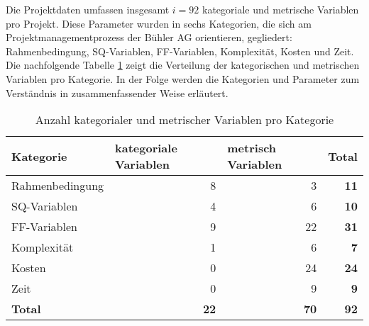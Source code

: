 \newline\newline
Die Projektdaten umfassen insgesamt $i = 92$ kategoriale und metrische Variablen pro Projekt. Diese Parameter wurden in sechs Kategorien, die sich am Projektmanagementprozess der Bühler AG orientieren, gegliedert: Rahmenbedingung, SQ-Variablen, FF-Variablen, Komplexität, Kosten und Zeit. Die nachfolgende Tabelle \ref{tab:katmet} zeigt die Verteilung der kategorischen und metrischen Variablen pro Kategorie. In der Folge werden die Kategorien und Parameter zum Verständnis in zusammenfassender Weise erläutert.
\begin{table}[H]
	\centering
	\caption{Anzahl kategorialer und metrischer Variablen pro Kategorie}
	\begin{tabular}{lrr|r}
		\toprule
		Kategorie & \multicolumn{1}{l}{kategoriale Variablen} & \multicolumn{1}{l}{metrisch Variablen} & \multicolumn{1}{l}{\textbf{Total}} \\
		\midrule
		Rahmenbedingung & 8     & 3     & \textbf{11} \\
		SQ-Variablen & 4     & 6     & \textbf{10} \\
		FF-Variablen & 9    & 22    & \textbf{31} \\
		Komplexität & 1     & 6     & \textbf{7} \\
		Kosten  & 0     & 24    & \textbf{24} \\
		Zeit  & 0     & 9     & \textbf{9} \\
		\bottomrule
		\textbf{Total} & \textbf{22} & \textbf{70} & \textbf{92} \\
	\end{tabular}%
	\label{tab:katmet}%
\end{table}%
